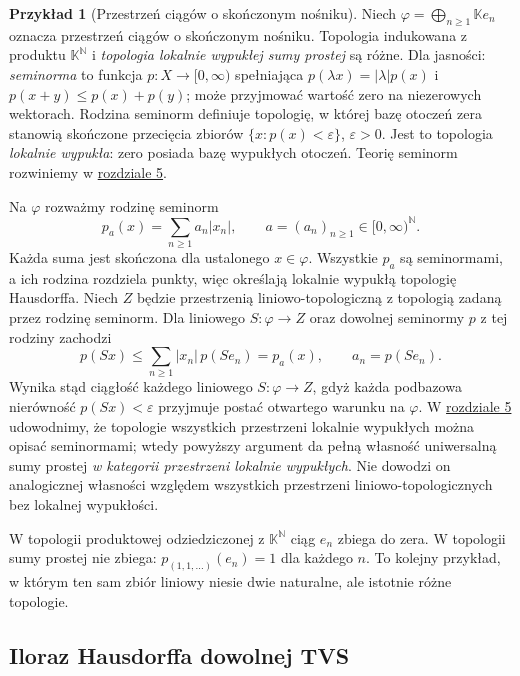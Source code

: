\documentclass[11pt,a4paper]{article}
\numberwithin{equation}{section}
\theoremstyle{plain}
\theoremstyle{definition}
\newtheorem{przyklad}[twierdzenie]{Przykład}
\theoremstyle{remark}
\newcommand{\N}{\mathbb N}
\newcommand{\K}{\mathbb K}
\begin{document}
\begin{przyklad}[Przestrzeń ciągów o skończonym nośniku]\label{ex:direct-sum}
Niech $\varphi=\bigoplus_{n\geq1}\K e_n$ oznacza
przestrzeń ciągów o skończonym nośniku. Topologia
indukowana z produktu $\K^{\N}$ i \emph{topologia
lokalnie wypukłej sumy prostej} są różne.
Dla jasności: \emph{seminorma} to funkcja $p:X\to[0,\infty)$
spełniająca $p(\lambda x)=|\lambda|p(x)$ i
$p(x+y)\leq p(x)+p(y)$; może przyjmować wartość zero
na niezerowych wektorach. Rodzina seminorm definiuje topologię,
w której bazę otoczeń zera stanowią skończone przecięcia
zbiorów $\{x:p(x)<\varepsilon\}$, $\varepsilon>0$.
Jest to topologia \emph{lokalnie wypukła}: zero posiada bazę
wypukłych otoczeń. Teorię seminorm rozwiniemy w \hyperref[sec:lokalnie-wypukle]{rozdziale 5}.

Na $\varphi$ rozważmy rodzinę seminorm
\[
 p_a(x)=\sum_{n\geq1}a_n|x_n|,
 \qquad a=(a_n)_{n\geq1}\in[0,\infty)^{\N}.
\]
Każda suma jest skończona dla ustalonego $x\in\varphi$.
Wszystkie $p_a$ są seminormami, a ich rodzina
rozdziela punkty, więc określają lokalnie wypukłą
topologię Hausdorffa. Niech $Z$ będzie przestrzenią
liniowo-topologiczną z topologią zadaną przez rodzinę
seminorm. Dla liniowego $S:\varphi\to Z$ oraz
dowolnej seminormy $p$ z tej rodziny zachodzi
\[
 p(Sx)\leq\sum_{n\geq1}|x_n|\,p(S e_n)
         =p_a(x),\qquad a_n=p(S e_n).
\]
Wynika stąd ciągłość każdego liniowego $S:\varphi\to Z$,
gdyż każda podbazowa nierówność $p(Sx)<\varepsilon$
przyjmuje postać otwartego warunku na $\varphi$.
W \hyperref[sec:lokalnie-wypukle]{rozdziale 5} udowodnimy, że topologie wszystkich
przestrzeni lokalnie wypukłych można opisać seminormami;
wtedy powyższy argument da pełną własność uniwersalną
sumy prostej \emph{w kategorii przestrzeni lokalnie wypukłych}.
Nie dowodzi on analogicznej własności względem wszystkich
przestrzeni liniowo-topologicznych bez lokalnej wypukłości.

W topologii produktowej odziedziczonej z $\K^{\N}$
ciąg $e_n$ zbiega do zera. W topologii sumy prostej
nie zbiega: $p_{(1,1,\dots)}(e_n)=1$ dla każdego $n$.
To kolejny przykład, w którym ten sam zbiór liniowy
niesie dwie naturalne, ale istotnie różne topologie.
\end{przyklad}

\subsection{Iloraz Hausdorffa dowolnej TVS}
\end{document}
